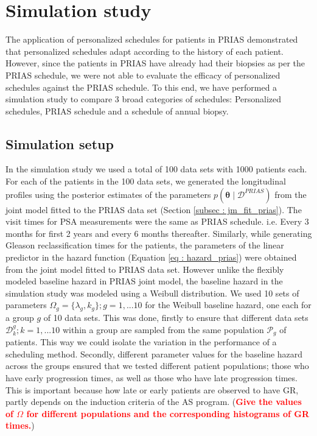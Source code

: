 
\section{Simulation study}
\label{sec: simulation_study}
The application of personalized schedules for patients in PRIAS demonstrated that personalized schedules adapt according to the history of each patient. However, since the patients in PRIAS have already had their biopsies as per the PRIAS schedule, we were not able to evaluate the efficacy of personalized schedules against the PRIAS schedule. To this end, we have performed a simulation study to compare 3 broad categories of schedules: Personalized schedules, PRIAS schedule and a schedule of annual biopsy.

\subsection{Simulation setup}
\label{subsec : simulation_setup}
In the simulation study we used a total of 100 data sets with 1000 patients each. For each of the patients in the 100 data sets, we generated the longitudinal profiles using the posterior estimates of the parameters $p(\boldsymbol{\theta} \mid \mathcal{D}^{PRIAS})$ from the joint model fitted to the PRIAS data set (Section \ref{subsec : jm_fit_prias}). The visit times for PSA measurements were the same as PRIAS schedule. i.e. Every 3 months for first 2 years and every 6 months thereafter. Similarly, while generating Gleason reclassification times for the patients, the parameters of the linear predictor in the hazard function (Equation \ref{eq : hazard_prias}) were obtained from the joint model fitted to PRIAS data set. However unlike the flexibly modeled baseline hazard in PRIAS joint model, the baseline hazard in the simulation study was modeled using a Weibull distribution. We used 10 sets of parameters $\Omega_g = \{\lambda_g, k_g\}; g = 1,... 10$ for the Weibull baseline hazard, one each for a group $g$ of 10 data sets. This was done, firstly to ensure that different data sets $\mathcal{D}^g_k; k = 1, ...10$ within a group are sampled from the same population $\mathcal{P}_g$ of patients. This way we could isolate the variation in the performance of a scheduling method. Secondly, different parameter values for the baseline hazard across the groups ensured that we tested different patient populations; those who have early progression times, as well as those who have late progression times. This is important because how late or early patients are observed to have GR, partly depends on the induction criteria of the AS program. (\textcolor{red}{\textbf{Give the values of $\Omega$ for different populations and the corresponding histograms of GR times.}})\\

